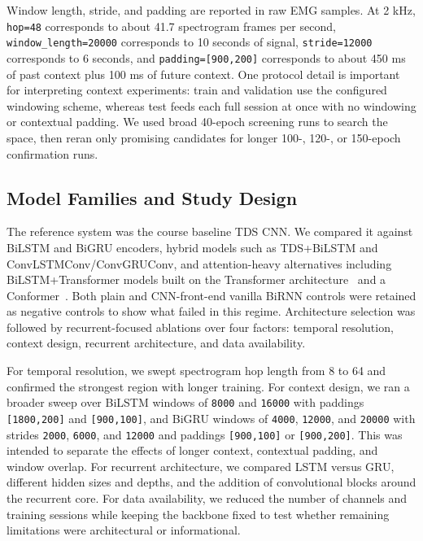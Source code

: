 Window length, stride, and padding are reported in raw EMG samples. At 2 kHz, \texttt{hop=48} corresponds to about 41.7 spectrogram frames per second, \texttt{window\_length=20000} corresponds to 10 seconds of signal, \texttt{stride=12000} corresponds to 6 seconds, and \texttt{padding=[900,200]} corresponds to about 450 ms of past context plus 100 ms of future context. One protocol detail is important for interpreting context experiments: train and validation use the configured windowing scheme, whereas test feeds each full session at once with no windowing or contextual padding. We used broad 40-epoch screening runs to search the space, then reran only promising candidates for longer 100-, 120-, or 150-epoch confirmation runs.

\subsection{Model Families and Study Design}

The reference system was the course baseline TDS CNN. We compared it against BiLSTM and BiGRU encoders, hybrid models such as TDS+BiLSTM and ConvLSTMConv/ConvGRUConv, and attention-heavy alternatives including BiLSTM+Transformer models built on the Transformer architecture~\cite{vaswani2017attention} and a Conformer~\cite{gulati2020conformer}. Both plain and CNN-front-end vanilla BiRNN controls were retained as negative controls to show what failed in this regime. Architecture selection was followed by recurrent-focused ablations over four factors: temporal resolution, context design, recurrent architecture, and data availability.

For temporal resolution, we swept spectrogram hop length from 8 to 64 and confirmed the strongest region with longer training. For context design, we ran a broader sweep over BiLSTM windows of \texttt{8000} and \texttt{16000} with paddings \texttt{[1800,200]} and \texttt{[900,100]}, and BiGRU windows of \texttt{4000}, \texttt{12000}, and \texttt{20000} with strides \texttt{2000}, \texttt{6000}, and \texttt{12000} and paddings \texttt{[900,100]} or \texttt{[900,200]}. This was intended to separate the effects of longer context, contextual padding, and window overlap. For recurrent architecture, we compared LSTM versus GRU, different hidden sizes and depths, and the addition of convolutional blocks around the recurrent core. For data availability, we reduced the number of channels and training sessions while keeping the backbone fixed to test whether remaining limitations were architectural or informational.

